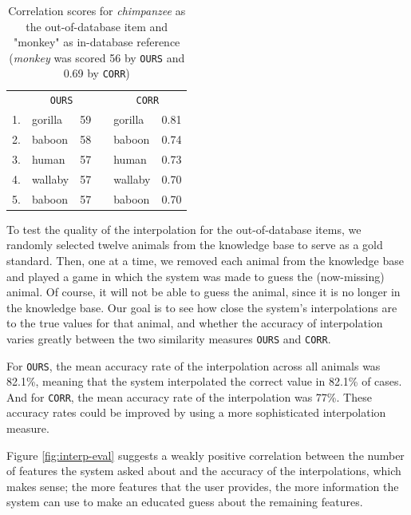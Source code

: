 \documentclass[11pt,a4paper]{article}
\begin{document}
{\begin{table}[h]
    \centering
    \begin{tabular}{clcclc}
    \toprule
    & \multicolumn{2}{c}{\texttt{OURS}} && \multicolumn{2}{c}{\texttt{CORR}} \\
    \cmidrule{2-3} \cmidrule{5-6}
    1. & gorilla & 59 && gorilla & 0.81 \\
    2. & baboon & 58 && baboon & 0.74 \\
    3. & human & 57 && human & 0.73 \\
    4. & wallaby & 57 && wallaby & 0.70 \\
    5. & baboon & 57 && baboon & 0.70 \\
    \bottomrule
    \end{tabular}
\caption{Correlation scores for \textit{chimpanzee} as the out-of-database item and "monkey" as in-database reference (\textit{monkey} was scored 56 by \texttt{OURS} and 0.69 by \texttt{CORR})}
\label{tab:corr2}
\end{table}


To test the quality of the interpolation for the out-of-database items, we randomly selected twelve animals from the knowledge base to serve as a gold standard.
Then, one at a time, we removed each animal from the knowledge base and played a game in which the system was made to guess the (now-missing) animal. 
Of course, it will not be able to guess the animal, since it is no longer in the knowledge base.
Our goal is to see how close the system's interpolations are to the true values for that animal, and whether the accuracy of interpolation varies greatly between the two similarity measures \texttt{OURS} and \texttt{CORR}.

For \texttt{OURS}, the mean accuracy rate of the interpolation across all animals was 82.1\%, meaning that the system interpolated the correct value in 82.1\% of cases.
And for \texttt{CORR}, the mean accuracy rate of the interpolation was 77\%.
These accuracy rates could be improved by using a more sophisticated interpolation measure.

Figure \ref{fig:interp-eval} suggests a weakly positive correlation between the number of features the system asked about and the accuracy of the interpolations, which makes sense; the more features that the user provides, the more information the system can use to make an educated guess about the remaining features.


}
\end{document}
